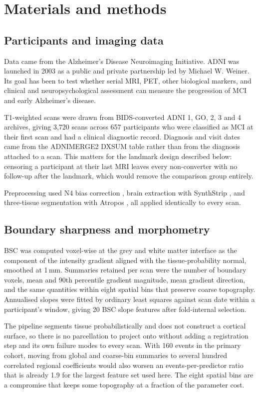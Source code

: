 \documentclass[blue]{ludusofficial}
\begin{document}
\section{Materials and methods}

\subsection{Participants and imaging data}

Data came from the Alzheimer's Disease Neuroimaging Initiative. ADNI was launched in 2003 as a public and private partnership led by Michael W. Weiner. Its goal has been to test whether serial MRI, PET, other biological markers, and clinical and neuropsychological assessment can measure the progression of MCI and early Alzheimer's disease.

T1-weighted scans were drawn from BIDS-converted ADNI 1, GO, 2, 3 and 4 archives, giving 3{,}720 scans across 657 participants who were classified as MCI at their first scan and had a clinical diagnostic record. Diagnosis and visit dates came from the ADNIMERGE2 DXSUM table rather than from the diagnosis attached to a scan. This matters for the landmark design described below: censoring a participant at their last MRI leaves every non-converter with no follow-up after the landmark, which would remove the comparison group entirely.

Preprocessing used N4 bias correction \cite{tustison2010n4}, brain extraction with SynthStrip \cite{hoopes2022synthstrip}, and three-tissue segmentation with Atropos \cite{avants2011atropos}, all applied identically to every scan.

\subsection{Boundary sharpness and morphometry}

BSC was computed voxel-wise at the grey and white matter interface as the component of the intensity gradient aligned with the tissue-probability normal, smoothed at 1\,mm. Summaries retained per scan were the number of boundary voxels, mean and 90th percentile gradient magnitude, mean gradient direction, and the same quantities within eight spatial bins that preserve coarse topography. Annualised slopes were fitted by ordinary least squares against scan date within a participant's window, giving 20 BSC slope features after fold-internal selection.

The pipeline segments tissue probabilistically and does not construct a cortical surface, so there is no parcellation to project onto without adding a registration step and its own failure modes to every scan. With 160 events in the primary cohort, moving from global and coarse-bin summaries to several hundred correlated regional coefficients would also worsen an events-per-predictor ratio that is already 1.9 for the largest feature set used here. The eight spatial bins are a compromise that keeps some topography at a fraction of the parameter cost.
\end{document}
